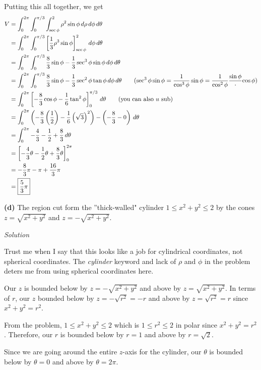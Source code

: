 \documentclass{article}
\newcommand{\lrp}[1]{\left( #1 \right)}
\newcommand{\lrb}[1]{\left[ #1 \right]}
\newcommand{\Solution}{\textit{Solution}}
\begin{document}
Putting this all together, we get
\begin{align*}
    V&=\int_0^{2\pi}\int_0^{\pi/3}\int_{\sec\phi}^2\rho^2\sin\phi\,d\rho\,d\phi\,d\theta\\
    &=\int_0^{2\pi}\int_0^{\pi/3}\lrb{\frac{1}{3}\rho^3\sin\phi}_{\sec\phi}^2\,d\phi\,d\theta\\
    &=\int_0^{2\pi}\int_0^{\pi/3} \frac{8}{3}\sin\phi -\frac{1}{3}\sec^3\phi\sin\phi\,d\phi\,d\theta\\
    &=\int_0^{2\pi}\int_0^{\pi/3} \frac{8}{3}\sin\phi- \frac{1}{3}\sec^2\phi \tan\phi \,d\phi\,d\theta\tag{$\displaystyle \sec^3\phi\sin\phi=\frac{1}{\cos^3\phi}\sin\phi=\frac{1}{\cos^2\phi}\frac{\sin\phi}\cdot{\cos\phi}$}\\
    &=\int_0^{2\pi}\lrb{-\frac{8}{3}\cos\phi-\frac{1}{6}\tan^2\phi}_0^{\pi/3}\,d\theta\tag{you can also $u$ sub}\\
    &=\int_0^{2\pi} \lrp{-\frac{8}{3}\lrp{\frac{1}{2}}-\frac{1}{6}\lrp{\sqrt{3}}^2}-\lrp{-\frac{8}{3}-0}\,d\theta\\
    &=\int_0^{2\pi} -\frac{4}{3}-\frac{1}{2}+\frac{8}{3}\,d\theta\\
    &=\lrb{-\frac{4}{3}\theta -\frac{1}{2}\theta+\frac{8}{3}\theta}_0^{2\pi}\\
    &=-\frac{8}{3}\pi - \pi + \frac{16}{3}\pi\\
    &=\boxed{\frac{5}{3}\pi}
\end{align*}

{}\textbf{(d)} The region cut form the ''thick-walled" cylinder $1\leq x^2+y^2\leq 2$ by the cones $z=\sqrt{x^2+y^2}$ and $z=-\sqrt{x^2+y^2}$.

\Solution

Trust me when I say that this looks like a job for cylindrical coordinates, not spherical coordinates. The \textit{cylinder} keyword and lack of $\rho$ and $\phi$ in the problem deters me from using spherical coordinates here.

Our $z$ is bounded below by $z=-\sqrt{x^2+y^2}$ and above by $z=\sqrt{x^2+y^2}$. In terms of $r$, our $z$ bounded below by $z=-\sqrt{r^2}=-r$ and above by $z=\sqrt{r^2}=r$ since $x^2+y^2=r^2$.

From the problem, $1\leq x^2+y^2\leq 2$ which is $1\leq r^2\leq 2$ in polar since $x^2+y^2=r^2$. Therefore, our $r$ is bounded below by $r=1$ and above by $r=\sqrt{2}$.

Since we are going around the entire $z$-axis for the cylinder, our $\theta$ is bounded below by $\theta=0$ and above by $\theta=2\pi$.
\end{document}
